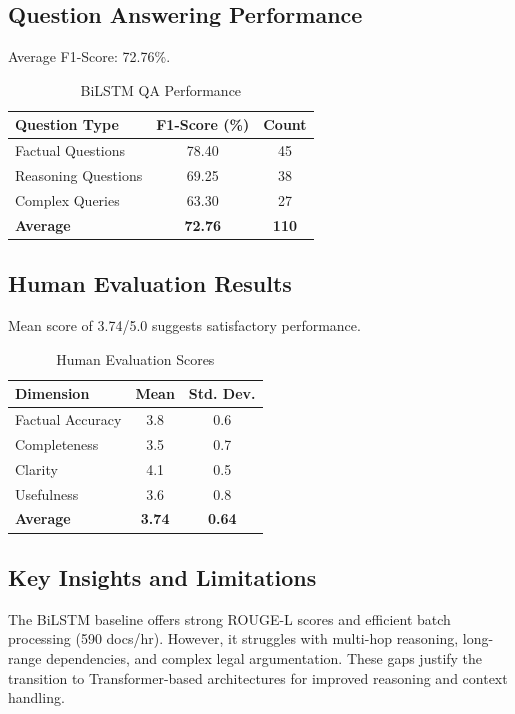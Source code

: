 \documentclass[conference]{IEEEtran}
\begin{document}
\subsection{Question Answering Performance}
Average F1-Score: 72.76\%.

\begin{table}[ht]
\centering
\caption{BiLSTM QA Performance}
\label{tab:qa_results}
\begin{tabular}{@{}lcc@{}}
\toprule
\textbf{Question Type} & \textbf{F1-Score (\%)} & \textbf{Count} \\
\midrule
Factual Questions & 78.40 & 45 \\
Reasoning Questions & 69.25 & 38 \\
Complex Queries & 63.30 & 27 \\
\midrule
\textbf{Average} & \textbf{72.76} & \textbf{110} \\
\bottomrule
\end{tabular}
\end{table}

\subsection{Human Evaluation Results}
Mean score of 3.74/5.0 suggests satisfactory performance.

\begin{table}[ht]
\centering
\caption{Human Evaluation Scores}
\label{tab:human_eval}
\begin{tabular}{@{}lcc@{}}
\toprule
\textbf{Dimension} & \textbf{Mean} & \textbf{Std. Dev.} \\
\midrule
Factual Accuracy & 3.8 & 0.6 \\
Completeness & 3.5 & 0.7 \\
Clarity & 4.1 & 0.5 \\
Usefulness & 3.6 & 0.8 \\
\midrule
\textbf{Average} & \textbf{3.74} & \textbf{0.64} \\
\bottomrule
\end{tabular}
\end{table}

\subsection{Key Insights and Limitations}
The BiLSTM baseline offers strong ROUGE-L scores and efficient batch processing (590 docs/hr). However, it struggles with multi-hop reasoning, long-range dependencies, and complex legal argumentation. These gaps justify the transition to Transformer-based architectures for improved reasoning and context handling.
\end{document}
